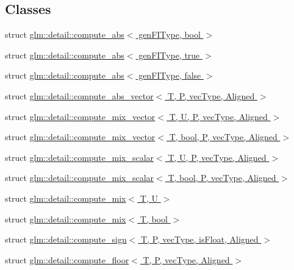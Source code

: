 \subsection*{Classes}
\begin{DoxyCompactItemize}
\item 
struct \hyperlink{structglm_1_1detail_1_1compute__abs}{glm\+::detail\+::compute\+\_\+abs$<$ gen\+F\+I\+Type, bool $>$}
\item 
struct \hyperlink{structglm_1_1detail_1_1compute__abs_3_01genFIType_00_01true_01_4}{glm\+::detail\+::compute\+\_\+abs$<$ gen\+F\+I\+Type, true $>$}
\item 
struct \hyperlink{structglm_1_1detail_1_1compute__abs_3_01genFIType_00_01false_01_4}{glm\+::detail\+::compute\+\_\+abs$<$ gen\+F\+I\+Type, false $>$}
\item 
struct \hyperlink{structglm_1_1detail_1_1compute__abs__vector}{glm\+::detail\+::compute\+\_\+abs\+\_\+vector$<$ T, P, vec\+Type, Aligned $>$}
\item 
struct \hyperlink{structglm_1_1detail_1_1compute__mix__vector}{glm\+::detail\+::compute\+\_\+mix\+\_\+vector$<$ T, U, P, vec\+Type, Aligned $>$}
\item 
struct \hyperlink{structglm_1_1detail_1_1compute__mix__vector_3_01T_00_01bool_00_01P_00_01vecType_00_01Aligned_01_4}{glm\+::detail\+::compute\+\_\+mix\+\_\+vector$<$ T, bool, P, vec\+Type, Aligned $>$}
\item 
struct \hyperlink{structglm_1_1detail_1_1compute__mix__scalar}{glm\+::detail\+::compute\+\_\+mix\+\_\+scalar$<$ T, U, P, vec\+Type, Aligned $>$}
\item 
struct \hyperlink{structglm_1_1detail_1_1compute__mix__scalar_3_01T_00_01bool_00_01P_00_01vecType_00_01Aligned_01_4}{glm\+::detail\+::compute\+\_\+mix\+\_\+scalar$<$ T, bool, P, vec\+Type, Aligned $>$}
\item 
struct \hyperlink{structglm_1_1detail_1_1compute__mix}{glm\+::detail\+::compute\+\_\+mix$<$ T, U $>$}
\item 
struct \hyperlink{structglm_1_1detail_1_1compute__mix_3_01T_00_01bool_01_4}{glm\+::detail\+::compute\+\_\+mix$<$ T, bool $>$}
\item 
struct \hyperlink{structglm_1_1detail_1_1compute__sign}{glm\+::detail\+::compute\+\_\+sign$<$ T, P, vec\+Type, is\+Float, Aligned $>$}
\item 
struct \hyperlink{structglm_1_1detail_1_1compute__floor}{glm\+::detail\+::compute\+\_\+floor$<$ T, P, vec\+Type, Aligned $>$}
\item 

\end{DoxyCompactItemize}
